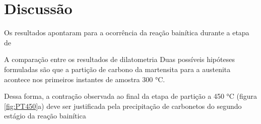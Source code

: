 \chapter{Discuss\~{a}o}

Os resultados apontaram para a ocorrência da reação bainítica durante a etapa de 

A comparação entre os resultados de dilatometria 
Duas possíveis hipóteses formuladas são que a partição de carbono da martensita para a austenita acontece nos primeiros instantes de amostra 300 °C.


Dessa forma, a contração observada ao final da etapa de partição a 450 °C (figura \ref{fig:PT450}a) deve ser justificada pela precipitação de carbonetos do segundo estágio da reação bainítica 